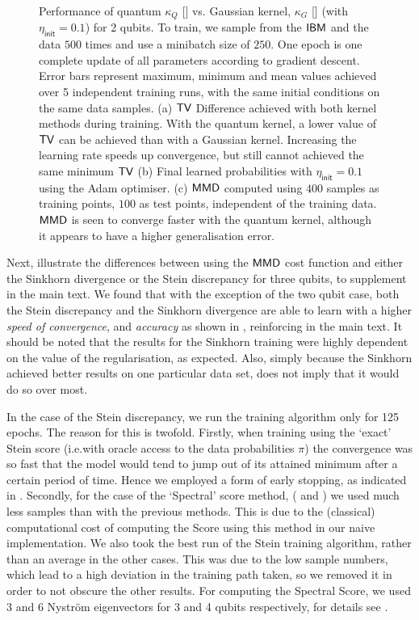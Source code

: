 \begin{figure}
    \caption{Performance of quantum $\kappa_Q$ [\crule[red]{0.2cm}{0.2cm}] vs. Gaussian kernel,  $\kappa_G$ [\crule[blue]{0.2cm}{0.2cm}] (with $\eta_{\mathsf{init}} = 0.1$) for 2 qubits. To train, we sample from the $\textsf{IBM}$ and the data $500$ times and use a minibatch size of $250$. One epoch is one complete update of all parameters according to gradient descent. Error bars represent maximum, minimum and mean values achieved over 5 independent training runs, with the same initial conditions on the same data samples. (a) $\operatorname{\textsf{TV}}$ Difference achieved with both kernel methods during training. With the quantum kernel, a lower value of $\operatorname{\textsf{TV}}$ can be achieved than with a Gaussian kernel. Increasing the learning rate speeds up convergence, but still cannot achieved the same minimum $\operatorname{\textsf{TV}}$ (b) Final learned probabilities with $\eta_{\mathsf{init}} = 0.1$ using the Adam optimiser. (c) $\operatorname{\textsf{MMD}}$ computed using $400$ samples as training points, $100$ as test points, independent of the training data. $\operatorname{\textsf{MMD}}$ is seen to converge faster with the quantum kernel, although it appears to have a higher generalisation error.}
    \label{fig:QvGkernel2}
\end{figure}


Next,  illustrate the differences between using the $\operatorname{\textsf{MMD}}$ cost function and either the Sinkhorn divergence or the Stein discrepancy for three qubits, to supplement  in the main text. We found that with the exception of the two qubit case, both the Stein discrepancy and the Sinkhorn divergence are able to learn with a higher \textit{speed of convergence}, and \textit{accuracy} as shown in , reinforcing  in the main text. It should be noted that the results for the Sinkhorn training were highly dependent on the value of the regularisation, as expected. Also, simply because the Sinkhorn achieved better results on one particular data set, does not imply that it would do so over most. 

In the case of the Stein discrepancy, we run the training algorithm only for 125 epochs. The reason for this is twofold. Firstly, when training using the `exact' Stein score (i.e.\@ with oracle access to the data probabilities $\pi$) the convergence was so fast that the model would tend to jump out of its attained minimum after a certain period of time. Hence we employed a form of early stopping, as indicated in . Secondly, for the case of the `Spectral' score method, ( and ) we used much less samples than with the previous methods. This is due to the (classical) computational cost of computing the Score using this method in our naive implementation. We also took the best run of the Stein training algorithm, rather than an average in the other cases. This was due to the low sample numbers, which lead to a high deviation in the training path taken, so we removed it in order to not obscure the other results. For computing the Spectral Score, we used 3 and 6 Nystr{\"o}m eigenvectors for 3 and 4 qubits respectively, for details see . 

